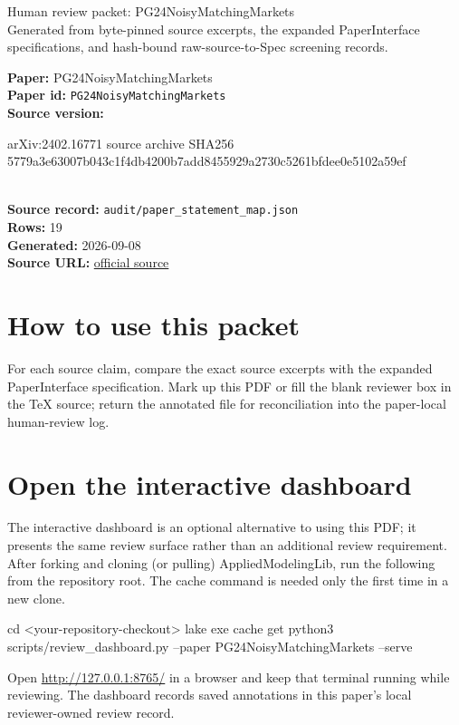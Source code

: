 \documentclass[10pt]{article}
\begin{document}
\fontsize{9}{10}\selectfont

\begin{center}
{\LARGE Human review packet: PG24NoisyMatchingMarkets}\\[0.35em]
\small Generated from byte-pinned source excerpts, the expanded PaperInterface
specifications, and hash-bound raw-source-to-Spec screening records.
\end{center}

\noindent\textbf{Paper:} PG24NoisyMatchingMarkets\\
\textbf{Paper id:} \texttt{PG24NoisyMatchingMarkets}\\
\textbf{Source version:} \parbox[t]{0.76\linewidth}{\raggedright arXiv:2402.16771 source archive SHA256 5779a3e63007b043c1f4db4200b7add8455929a2730c5261bfdee0e5102a59ef}\\
\textbf{Source record:} \texttt{audit/paper\_statement\_map.json}\\
\textbf{Rows:} 19\\
\textbf{Generated:} 2026-09-08\\
\textbf{Source URL:} \href{https://arxiv.org/abs/2402.16771}{official source}





\section*{How to use this packet}
For each source claim, compare the exact source excerpts with the expanded
PaperInterface specification. Mark up this PDF or fill the blank reviewer box in the TeX source;
return the annotated file for reconciliation into the paper-local human-review
log.

\section*{Open the interactive dashboard}
The interactive dashboard is an optional alternative to using this PDF; it
presents the same review surface rather than an additional review requirement.
After forking and cloning (or pulling) AppliedModelingLib, run the following from the
repository root. The cache command is needed only the first time in a new clone.
\begin{ReviewVerbatim}
cd <your-repository-checkout>
lake exe cache get
python3 scripts/review_dashboard.py --paper PG24NoisyMatchingMarkets --serve
\end{ReviewVerbatim}
Open \url{http://127.0.0.1:8765/} in a browser and keep that terminal running
while reviewing. The dashboard records saved annotations in this paper's local
reviewer-owned review record.
\end{document}
